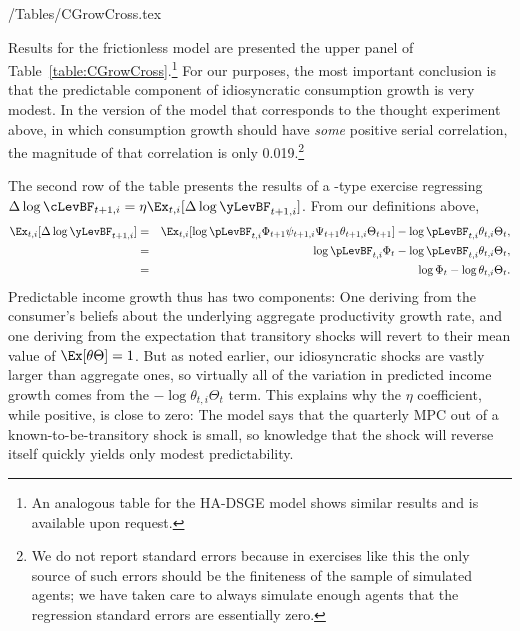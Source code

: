 \documentclass[titlepage]{\econtex}\newcommand{\texname}{cAndCwithStickyE}
\begin{document}
\econtexRoot/Tables/CGrowCross.tex

Results for the frictionless model are presented the upper panel of Table~\ref{table:CGrowCross}.\footnote{An analogous table for the HA-DSGE model shows similar results and is available upon request.}  For our purposes, the most important conclusion is that the predictable component of idiosyncratic consumption growth is very modest.  In the version of the model that corresponds to the thought experiment above, in which consumption growth should have {\it some} positive serial correlation, the magnitude of that correlation is only 0.019.\footnote{We do not report standard errors because in exercises like this the only source of such errors should be the finiteness of the sample of simulated agents; we have taken care to always simulate enough agents that the regression standard errors are essentially zero.}

The second row of the table presents the results of a \cite{cmModel}-type exercise regressing $\Delta \log \cLevBF_{t+1,i} = \eta \Ex_{t,i}[\Delta \log \yLevBF_{t+1,i}]$.  From our definitions above,
\begin{eqnarray*}
  \Ex_{t,i}[\Delta \log \yLevBF_{t+1,i}] & = & \Ex_{t,i}[\log \pLevBF_{t,i}\Phi_{t+1}\psi_{t+1,i}\Psi_{t+1}\theta_{t+1,i}\Theta_{t+1}] - \log \pLevBF_{t,i}\theta_{t,i}\Theta_{t},
  \\ & = & \log \pLevBF_{t,i}\Phi_{t} - \log \pLevBF_{t,i}\theta_{t,i}\Theta_{t},
   \\ & = & \log \Phi_{t} - \log \theta_{t,i}\Theta_{t}.
\end{eqnarray*}
Predictable income growth thus has two components: One deriving from the consumer's beliefs about the underlying aggregate productivity growth rate, and one deriving from the expectation that transitory shocks will revert to their mean value of $\Ex[\theta \Theta]=1$.  But as noted earlier, our idiosyncratic shocks are vastly larger than aggregate ones, so virtually all of the variation in predicted income growth comes from the $-\log \theta_{t,i}\Theta_{t}$ term.  This explains why the $\eta$ coefficient, while positive, is close to zero: The model says that the quarterly MPC out of a known-to-be-transitory shock is small, so knowledge that the shock will reverse itself quickly yields only modest predictability.
\end{document}
